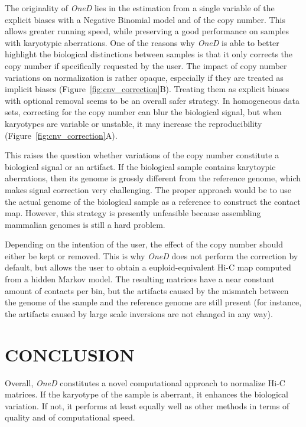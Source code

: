 \documentclass[a4,center,fleqn]{NAR}
\begin{document}
The originality of \textit{OneD} lies in the estimation from a single
variable of the explicit biases with a Negative Binomial model and of the
copy number. This allows greater running speed, while preserving a good
performance on samples with karyotypic aberrations. One of the reasons why
\textit{OneD} is able to better highlight the biological distinctions
between samples is that it only corrects the copy number if specifically
requested by the user. The impact of copy number variations on
normalization is rather opaque, especially if they are treated as implicit
biases (Figure~\ref{fig:cnv_correction}B). Treating them as explicit
biases with optional removal seems to be an overall safer strategy. In
homogeneous data sets, correcting for the copy number can blur the
biological signal, but when karyotypes are variable or unstable, it may
increase the reproducibility (Figure~\ref{fig:cnv_correction}A).

This raises the question whether variations of the copy number constitute
a biological signal or an artifact. If the biological sample contains
karytoypic aberrations, then its genome is grossly different from the
reference genome, which makes signal correction very challenging. The
proper approach would be to use the actual genome of the biological sample
as a reference to construct the contact map. However, this strategy is
presently unfeasible because assembling mammalian genomes is still a hard
problem.

Depending on the intention of the user, the effect of the copy number
should either be kept or removed. This is why \textit{OneD} does not
perform the correction by default, but allows the user to obtain a
euploid-equivalent Hi-C map computed from a hidden Markov model. The
resulting matrices have a near constant amount of contacts per bin, but
the artifacts caused by the mismatch between the genome of the sample and
the reference genome are still present (for instance, the artifacts caused
by large scale inversions are not changed in any way).


\section{CONCLUSION}

Overall, \textit{OneD} constitutes a novel computational approach to
normalize Hi-C matrices. If the karyotype of the sample is aberrant, it
enhances the biological variation.  If not, it performs at least equally
well as other methods in terms of quality and of computational speed.
\end{document}
